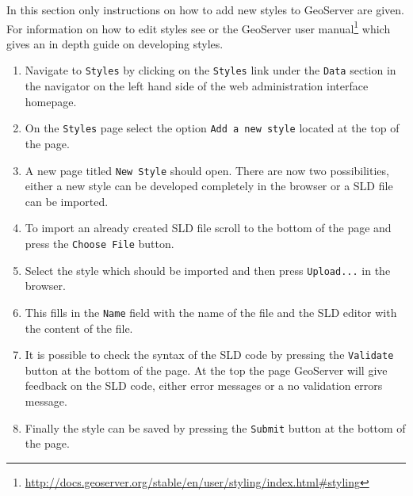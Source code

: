 In this section only instructions on how to add new styles to GeoServer are given. For information on how to edit styles see  or the GeoServer user manual\footnote{\url{http://docs.geoserver.org/stable/en/user/styling/index.html\#styling}} which gives an in depth guide on developing styles.

\begin{enumerate}
	\item Navigate to \lstinline|Styles| by clicking on the \lstinline|Styles| link under the \lstinline|Data| section in the navigator on the left hand side of the web administration interface homepage.
	\item On the \lstinline|Styles| page select the option \lstinline|Add a new style| located at the top of the page.
	\item A new page titled \lstinline|New Style| should open. There are now two possibilities, either a new style can be developed completely in the browser or a SLD file can be imported.
	\item To import an already created SLD file scroll to the bottom of the page and press the \lstinline|Choose File| button.
	\item Select the style which should be imported and then press \lstinline|Upload...| in the browser.
	\item This fills in the \lstinline|Name| field with the name of the file and the SLD editor with the content of the file.
	\item It is possible to check the syntax of the SLD code by pressing the \lstinline|Validate| button at the bottom of the page. At the top the page GeoServer will give feedback on the SLD code, either error messages or a no validation errors message.
	\item Finally the style can be saved by pressing the \lstinline|Submit| button at the bottom of the page.
\end{enumerate}
